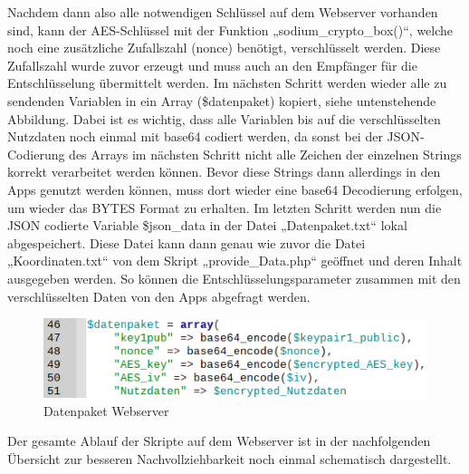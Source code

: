 Nachdem dann also alle notwendigen Schlüssel auf dem Webserver vorhanden sind, kann der AES-Schlüssel mit der Funktion „sodium\_crypto\_box()“, welche noch eine zusätzliche Zufallszahl (nonce) benötigt, verschlüsselt werden. Diese Zufallszahl wurde zuvor erzeugt und muss auch an den Empfänger für die Entschlüsselung übermittelt werden. Im nächsten Schritt werden wieder alle zu sendenden Variablen in ein Array (\$datenpaket) kopiert, siehe untenstehende Abbildung. Dabei ist es wichtig, dass alle Variablen bis auf die verschlüsselten Nutzdaten noch einmal mit base64 codiert werden, da sonst bei der JSON-Codierung des Arrays im nächsten Schritt nicht alle Zeichen der einzelnen Strings korrekt verarbeitet werden können. Bevor diese Strings dann allerdings in den Apps genutzt werden können, muss dort wieder eine base64 Decodierung erfolgen, um wieder das BYTES Format zu erhalten.
Im letzten Schritt werden nun die JSON codierte Variable \$json\_data in der Datei „Datenpaket.txt“ lokal abgespeichert. Diese Datei kann dann genau wie zuvor die Datei „Koordinaten.txt“ von dem Skript „provide\_Data.php“ geöffnet und deren Inhalt ausgegeben werden. So können die Entschlüsselungsparameter zusammen mit den verschlüsselten Daten von den Apps abgefragt werden.
\begin{figure} [H]
	\begin{center}
		\includegraphics[width=1\textwidth]{Bilder/Webserver_verschluesslung.png}
		\caption{Datenpaket Webserver}
		\label{server-dp}
	\end{center}
\end{figure}
Der gesamte Ablauf der Skripte auf dem Webserver ist in der nachfolgenden Übersicht zur besseren Nachvollziehbarkeit noch einmal schematisch dargestellt.
